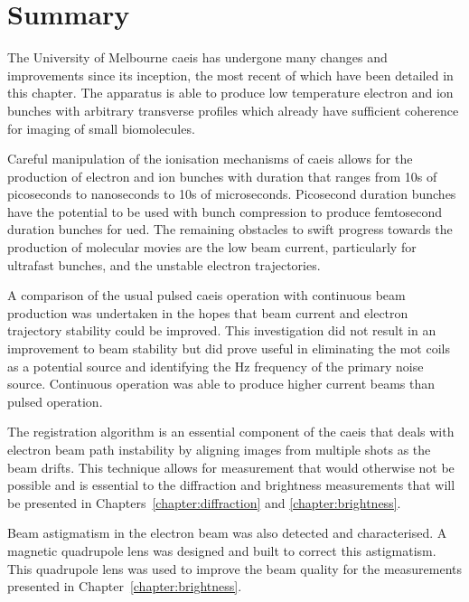\section{Summary}

The University of Melbourne \gls{caeis} has undergone many changes and improvements since its inception, the most recent of which have been detailed in this chapter.
The apparatus is able to produce low temperature electron and ion bunches with arbitrary transverse profiles which already have sufficient coherence for imaging of small biomolecules.

Careful manipulation of the ionisation mechanisms of \gls{caeis} allows for the production of electron and ion bunches with duration that ranges from 10s of picoseconds to nanoseconds to 10s of microseconds.
Picosecond duration bunches have the potential to be used with bunch compression to produce femtosecond duration bunches for \gls{ued}.
The remaining obstacles to swift progress towards the production of molecular movies are the low beam current, particularly for ultrafast bunches, and the unstable electron trajectories.

A comparison of the usual pulsed \gls{caeis} operation with continuous beam production was undertaken in the hopes that beam current and electron trajectory stability could be improved.
This investigation did not result in an improvement to beam stability but did prove useful in eliminating the \gls{mot} coils as a potential source and identifying the \unit[50]{Hz} frequency of the primary  noise source.
Continuous operation was able to produce higher current beams than pulsed operation.

The registration algorithm is an essential component of the \gls{caeis} that deals with electron beam path instability by aligning images from multiple shots as the beam drifts.
This technique allows for measurement that would otherwise not be possible and is essential to the diffraction and brightness measurements that will be presented in Chapters~\ref{chapter:diffraction} and \ref{chapter:brightness}.

Beam astigmatism in the electron beam was also detected and characterised.
A magnetic quadrupole lens was designed and built to correct this astigmatism.
This quadrupole lens was used to improve the beam quality for the measurements presented in Chapter~\ref{chapter:brightness}.